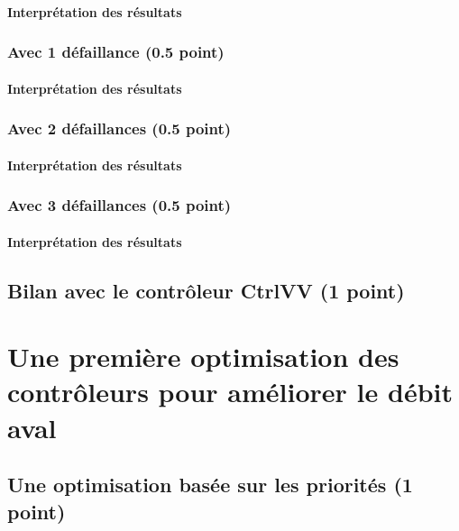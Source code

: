 \documentclass[a4paper]{book}
\begin{document}
\paragraph{Interprétation des résultats}

\subsubsection{Avec 1 défaillance (0.5 point)}

\paragraph{Interprétation des résultats}

\subsubsection{Avec 2 défaillances (0.5 point)}

\paragraph{Interprétation des résultats}

\subsubsection{Avec 3 défaillances (0.5 point)}

\paragraph{Interprétation des résultats}

\subsection{Bilan avec le contrôleur CtrlVV (1 point)}

\section{Une première optimisation des contrôleurs pour améliorer le débit aval}
\subsection{Une optimisation basée sur les priorités (1 point)}
\small{}
\end{document}
